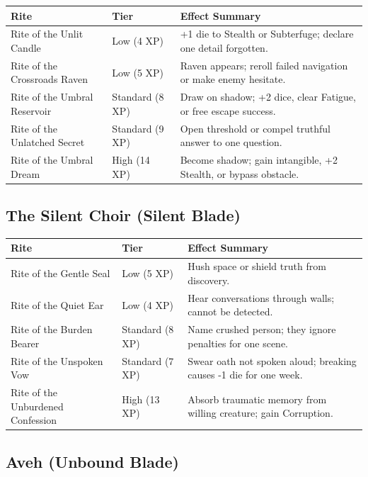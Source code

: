 \begin{longtable}{p{} p{} p{}}
\hline
\textbf{Rite} & \textbf{Tier} & \textbf{Effect Summary} \\
\hline
Rite of the Unlit Candle & Low (4 XP) & +1 die to Stealth or Subterfuge; declare one detail forgotten. \\
Rite of the Crossroads Raven & Low (5 XP) & Raven appears; reroll failed navigation or make enemy hesitate. \\
Rite of the Umbral Reservoir & Standard (8 XP) & Draw on shadow; +2 dice, clear Fatigue, or free escape success. \\
Rite of the Unlatched Secret & Standard (9 XP) & Open threshold or compel truthful answer to one question. \\
Rite of the Umbral Dream & High (14 XP) & Become shadow; gain intangible, +2 Stealth, or bypass obstacle. \\
\hline
\end{longtable}

\subsection{The Silent Choir (Silent Blade)}

\begin{longtable}{p{} p{} p{}}
\hline
\textbf{Rite} & \textbf{Tier} & \textbf{Effect Summary} \\
\hline
Rite of the Gentle Seal & Low (5 XP) & Hush space or shield truth from discovery. \\
Rite of the Quiet Ear & Low (4 XP) & Hear conversations through walls; cannot be detected. \\
Rite of the Burden Bearer & Standard (8 XP) & Name crushed person; they ignore penalties for one scene. \\
Rite of the Unspoken Vow & Standard (7 XP) & Swear oath not spoken aloud; breaking causes -1 die for one week. \\
Rite of the Unburdened Confession & High (13 XP) & Absorb traumatic memory from willing creature; gain Corruption. \\
\hline
\end{longtable}

\subsection{Aveh (Unbound Blade)}

